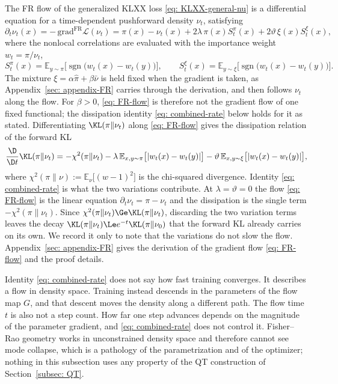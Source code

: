 \documentclass{article}
\begin{document}
The FR flow of the generalized KLXX loss \eqref{eq: KLXX-general-nu} is a differential equation for a time-dependent pushforward density $\nu_t$, satisfying
\begin{equation}
	\partial_t\nu_t(x) = -\,\mathrm{grad}^{\mathrm{FR}}\mathcal L(\nu_t) = \pi(x)-\nu_t(x) + 2\lambda\,\pi(x)S^{\pi}_t(x) + 2\vartheta\,\xi(x)S^{\xi}_t(x),
	\label{eq: FR-flow}
\end{equation}
where the nonlocal correlations are evaluated with the importance weight $w_t=\pi/\nu_t$,
\begin{equation}
	S^{\pi}_t(x) = \mathbb E_{y\sim\pi}\bigl[\operatorname{sgn}\bigl(w_t(x)-w_t(y)\bigr)\bigr],
	\qquad
	S^{\xi}_t(x) = \mathbb E_{y\sim\xi}\bigl[\operatorname{sgn}\bigl(w_t(x)-w_t(y)\bigr)\bigr].
	\label{eq: FR-S-t}
\end{equation}
The mixture $\xi=\alpha\hat\pi+\beta\bar\nu$ is held fixed when the gradient is taken, as Appendix~\ref{sec: appendix-FR} carries through the derivation, and then follows $\nu_t$ along the flow. For $\beta>0$, \eqref{eq: FR-flow} is therefore not the gradient flow of one fixed functional; the dissipation identity \eqref{eq: combined-rate} below holds for it as stated.
Differentiating $\KL(\pi\|\nu_t)$ along \eqref{eq: FR-flow} gives the dissipation relation of the forward KL
\begin{equation}
	\frac{\D}{\D t}\KL(\pi\|\nu_t) = -\chi^2(\pi\|\nu_t)
	- \lambda\,\mathbb E_{x,y\sim\pi}\bigl[|w_t(x)-w_t(y)|\bigr]
	- \vartheta\,\mathbb E_{x,y\sim\xi}\bigl[|w_t(x)-w_t(y)|\bigr],
	\label{eq: combined-rate}
\end{equation}
where $\chi^2(\pi\|\nu):=\mathbb E_{\nu}\bigl[(w-1)^2\bigr]$ is the chi-squared divergence. Identity \eqref{eq: combined-rate} is what the two variations contribute. At $\lambda=\vartheta=0$ the flow \eqref{eq: FR-flow} is the linear equation $\partial_t\nu_t=\pi-\nu_t$ and the dissipation is the single term $-\chi^2(\pi\|\nu_t)$. Since $\chi^2(\pi\|\nu_t)\Ge\KL(\pi\|\nu_t)$, discarding the two variation terms leaves the decay $\KL(\pi\|\nu_t)\Le e^{-t}\KL(\pi\|\nu_0)$ that the forward KL already carries on its own. We record it only to note that the variations do not slow the flow. Appendix~\ref{sec: appendix-FR} gives the derivation of the gradient flow \eqref{eq: FR-flow} and the proof details.

\begin{remark}
	Identity \eqref{eq: combined-rate} does not say how fast training converges. It describes a flow in density space. Training instead descends in the parameters of the flow map $G$, and that descent moves the density along a different path. The flow time $t$ is also not a step count. How far one step advances depends on the magnitude of the parameter gradient, and \eqref{eq: combined-rate} does not control it. Fisher--Rao geometry works in unconstrained density space and therefore cannot see mode collapse, which is a pathology of the parametrization and of the optimizer; nothing in this subsection uses any property of the QT construction of Section~\ref{subsec: QT}.
\end{remark}
\end{document}
